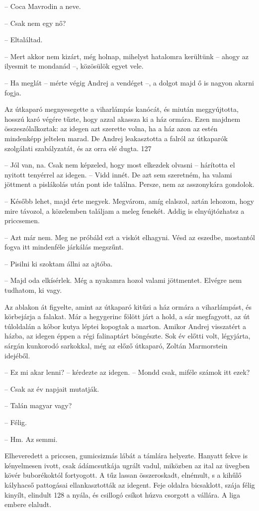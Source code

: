 \documentclass{IEEEtran}
\begin{document}
– Coca Mavrodin a neve.

– Csak nem egy nő?

– Eltaláltad.

– Mert akkor nem kizárt, még holnap, mihelyst hatalomra kerültünk – ahogy az
ilyesmit te mondanád –, közösülök egyet vele.

– Ha meglát – mérte végig Andrej a vendéget –, a dolgot majd ő is nagyon
akarni fogja.

Az útkaparó megnyesegette a viharlámpás kanócát, és miután meggyújtotta,
hosszú karó végére tűzte, hogy azzal akassza ki a ház ormára. Ezen majdnem
összeszólalkoztak: az idegen azt szerette volna, ha a ház azon az estén
mindenképp jeltelen marad. De Andrej leakasztotta a falról az útkaparók
szolgálati szabályzatát, és az orra elé dugta.
127

– Jól van, na. Csak nem képzeled, hogy most elkezdek olvasni – hárította el
nyitott tenyérrel az idegen. – Vidd innét. De azt sem szeretném, ha valami
jöttment a pislákolás után pont ide találna. Persze, nem az asszonykára
gondolok.

– Később lehet, majd érte megyek. Megvárom, amíg elalszol, aztán lehozom, hogy
mire távozol, a közelemben találjam a meleg fenekét. Addig is elnyújtózhatsz a
priccsemen.

– Azt már nem. Meg ne próbáld ezt a viskót elhagyni. Vésd az eszedbe,
mostantól fogva itt mindenféle járkálás megszűnt.

– Pisilni ki szoktam állni az ajtóba.

– Majd oda elkísérlek. Még a nyakamra hozol valami jöttmentet. Elvégre nem
tudhatom, ki vagy.

Az ablakon át figyelte, amint az útkaparó kitűzi a ház ormára a viharlámpást,
és körbejárja a falakat. Már a hegygerinc fölött járt a hold, a sár
megfagyott, az út túloldalán a kóbor kutya léptei kopogtak a marton. Amikor
Andrej visszatért a házba, az idegen éppen a régi falinaptárt böngészte. Sok
év előtti volt, légyjárta, sárgán kunkorodó sarkokkal, még az előző útkaparó,
Zoltán Marmorstein idejéből.

– Ez mi akar lenni? – kérdezte az idegen. – Mondd csak, miféle számok itt
ezek?

– Csak az év napjait mutatják.

– Talán magyar vagy?

– Félig.

– Hm. Az semmi.

Elheveredett a priccsen, gumicsizmás lábát a támlára helyezte. Hanyatt fekve
is kényelmesen ivott, csak ádámcsutkája ugrált vadul, miközben az ital az
üvegben kövér buborékoktól fortyogott. A tűz lassan összeroskadt, elnémult, s
a kihűlő kályhacső pattogásai ellankasztották az idegent. Feje oldalra
bicsaklott, szája félig kinyílt, elindult 128 a nyála, és csillogó csíkot húzva
csorgott a vállára. A liga embere elaludt.
\end{document}
